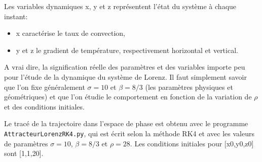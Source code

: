 \documentclass[%
oneside,                 %
final,                   %
10pt]{article}
\begin{document}
\noindent
Les variables dynamiques x, y et z représentent l'état du système à chaque instant:
\begin{itemize}
\item x caractérise le taux de convection,

\item y et z le gradient de température, respectivement horizontal et vertical.
\end{itemize}

\noindent
A vrai dire, la signification réelle des paramètres et des variables importe peu pour l'étude de la dynamique du système de Lorenz. Il faut simplement savoir que l'on fixe généralement $\sigma = 10$ et $\beta= 8/3$ (les paramètres physiques et géométriques) et que l'on étudie le comportement en fonction de la variation de $\rho$ et des conditions initiales.

Le tracé de la trajectoire dans l'espace de phase est obtenu avec le programme \texttt{AttracteurLorenzRK4.py}, qui est écrit selon la méthode RK4 et avec les valeurs de paramètres $\sigma = 10$, $\beta= 8/3$ et $\rho = 28$. Les conditions initiales pour [x0,y0,z0] sont [1,1,20].
\end{document}
